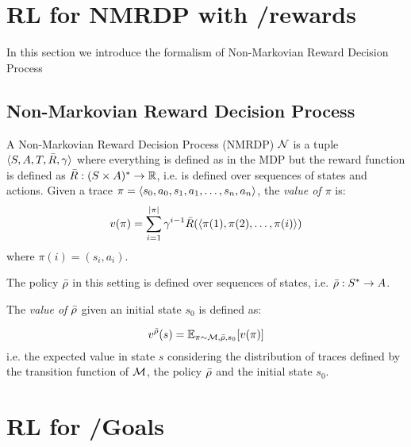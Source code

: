 \section{RL for NMRDP with \LTLf/\LDLf rewards}
In this section we introduce the formalism of Non-Markovian Reward Decision Process \citep{BacchusBG96} 
\subsection{Non-Markovian Reward Decision Process}
\label{NMRDP}
A Non-Markovian Reward Decision Process (NMRDP) $\mathcal{N}$ is a tuple $\langle S, A, T, \bar{R}, \gamma \rangle$ where everything is defined as in the MDP but the reward function is defined as $\bar{R} : (S \times A)^* \to \mathbb{R}$, i.e. is defined over sequences of states and actions. 	Given a trace $\pi = \langle s_0, a_0, s_1, a_1, \dots, s_n, a_n \rangle$, the \emph{value of $\pi$} is:
$$
v(\pi) = \sum_{i=1}^{|\pi|} \gamma^{i-1}\bar{R}(\langle \pi(1), \pi(2), \dots, \pi(i) \rangle)
$$
where $\pi(i) = (s_i, a_i)$.

The policy $\bar{\rho}$ in this setting is defined over sequences of states, i.e. $\bar{\rho}: S^* \to A$. 

The \emph{value of $\bar{\rho}$} given an initial state $s_0$ is defined as:

$$
v^{\bar{\rho}}(s) = \mathbb{E}_{\pi \sim \mathcal{M}, \bar{\rho}, s_0}[v(\pi)]
$$
i.e. the expected value in state $s$ considering the distribution of traces defined by the transition function of $\mathcal{M}$, the policy $\bar{\rho}$ and the initial state $s_0$.


\section{RL for \LTLf/\LDLf Goals}